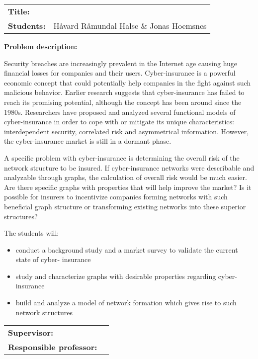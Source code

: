 \begin{titlingpage}

\noindent
\begin{tabular}{@{}p{4cm}l}
\textbf{Title:} 	& \thetitle \\
\textbf{Students:}	& Håvard Råmundal Halse \& Jonas Hoemsnes \\
\end{tabular}

\vspace{4ex}
\noindent\textbf{Problem description:}

Security breaches are increasingly prevalent in the Internet age causing huge financial losses for companies and their users. Cyber-insurance is a powerful economic concept that could potentially help companies in the fight against such malicious behavior. Earlier research suggests that cyber-insurance has failed to reach its promising potential, although the concept has been around since the 1980s. 
Researchers have proposed and analyzed several functional models of cyber-insurance in order to cope with or mitigate its unique characteristics: interdependent security, correlated risk and asymmetrical information. However, the cyber-insurance market is still in a dormant phase. 

A specific problem with cyber-insurance is determining the overall risk of the network structure to be insured. If cyber-insurance networks were describable and analyzable through graphs, the calculation of overall risk would be much easier. Are there specific graphs with properties that will help improve the market? Is it possible for insurers to incentivize companies forming networks with such beneficial graph structure or transforming existing networks into these superior structures?

The students will:
\begin{itemize}
\item conduct a background study and a market survey to validate the current state of cyber-
insurance
\item study and characterize graphs with desirable properties regarding cyber-insurance
\item build and analyze a model of network formation which gives rise to such network structures
\end{itemize}

\vspace{2ex}

\noindent
\begin{tabular}{@{}p{4cm}l}
\textbf{Supervisor:}			& \thesupervisor \\
\textbf{Responsible professor:} 	& \theprofessor \\
\end{tabular}

\end{titlingpage}
